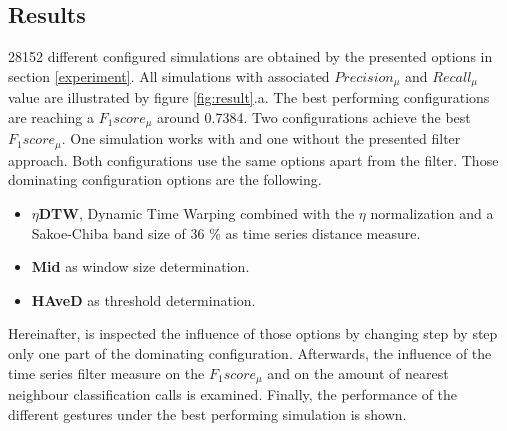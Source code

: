 \subsection{Results} \label{results}

28152 different configured simulations are obtained by the presented options in section \ref{experiment}. All
simulations with associated $Precision_{\mu}$ and $Recall_{\mu}$ value are illustrated by figure \ref{fig:result}.a. The
best performing configurations are reaching a $F_{1}score_{\mu}$ around 0.7384. Two configurations
achieve the best $F_{1}score_{\mu}$. One simulation works with and one without the presented filter approach. Both
configurations use the same options apart from the filter. Those dominating configuration options are the following.
\begin{itemize}
    \item \textbf{$\eta$DTW}, Dynamic Time Warping combined with the $\eta$ normalization and a Sakoe-Chiba band size of
        36 \% as time series distance measure.
    \item \textbf{Mid} as window size determination.
    \item \textbf{HAveD} as threshold determination.
\end{itemize}
Hereinafter, is inspected the influence of those options by changing step by step only one part of the
dominating configuration. Afterwards, the influence of the time series filter measure on the $F_{1}score_{\mu}$ and on
the amount of nearest neighbour classification calls is examined. Finally, the performance of the different gestures
under the best performing simulation is shown.

